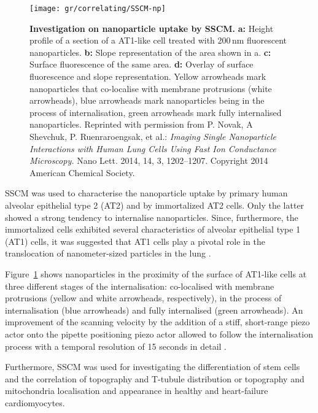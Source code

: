 \begin{figure}
  \centering
  \texttt{[image: gr/correlating/SSCM-np]}
  \caption{%
    \textbf{Investigation on nanoparticle uptake by SSCM.}  \textbf{a:} Height
    profile of a section of a AT1-like cell treated with 200\,nm fluorescent
    nanoparticles.  \textbf{b:} Slope representation of the area shown in a.
    \textbf{c:} Surface fluorescence of the same area.  \textbf{d:} Overlay
    of surface fluorescence and slope representation. Yellow arrowheads mark
    nanoparticles that co-localise with membrane protrusions (white
    arrowheads), blue arrowheads mark nanoparticles being in the process of
    internalisation, green arrowheads mark fully internalised nanoparticles.
    Reprinted with permission from P. Novak, A Shevchuk, P. Ruenraroengsak, et
    al.: \emph{Imaging Single Nanoparticle Interactions with Human Lung Cells
      Using Fast Ion Conductance Microscopy.} Nano Lett. 2014, 14, 3,
    1202–1207. Copyright 2014 American Chemical Society.}
  \label{fig:sscm-np}
\end{figure}


SSCM was used to characterise the nanoparticle uptake by primary human alveolar
epithelial type 2 (AT2) and by immortalized AT2 cells. Only the latter showed
a strong tendency to internalise nanoparticles. Since, furthermore, the
immortalized cells exhibited several characteristics of alveolar
epithelial type 1 (AT1) cells, it was suggested that AT1 cells play a pivotal
role in the translocation of nanometer-sized particles in the lung
\cite{Kemp2008}.

Figure~\ref{fig:sscm-np} shows nanoparticles in the proximity of the surface of
AT1-like cells at three different stages of the internalisation: co-localised
with membrane protrusions (yellow and white arrowheads, respectively), in the
process of internalisation (blue arrowheads) and fully internalised (green
arrowheads). An improvement of the scanning velocity by the addition of a stiff,
short-range piezo actor onto the pipette positioning piezo actor allowed to
follow the internalisation process with a temporal resolution of 15 seconds in
detail \cite{Novak2014}.

Furthermore, SSCM was used for investigating the differentiation of stem cells
\cite{Gorelik2008} and the correlation of topography and T-tubule distribution
\cite{Lyon2012} or topography and mitochondria localisation and appearance
\cite{Miragoli2016} in healthy and heart-failure cardiomyocytes.

